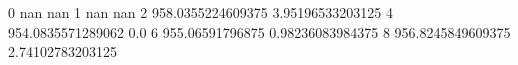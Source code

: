 0 nan nan
1 nan nan
2 958.0355224609375 3.95196533203125
4 954.0835571289062 0.0
6 955.06591796875 0.98236083984375
8 956.8245849609375 2.74102783203125
